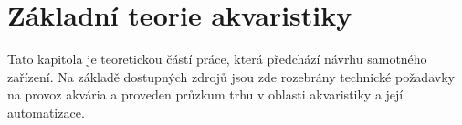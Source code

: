 \chapter{Základní teorie akvaristiky}
    Tato kapitola je teoretickou částí práce, která předchází návrhu samotného zařízení. Na základě dostupných zdrojů jsou zde rozebrány technické požadavky na provoz akvária a proveden průzkum trhu v oblasti akvaristiky a její automatizace.  











